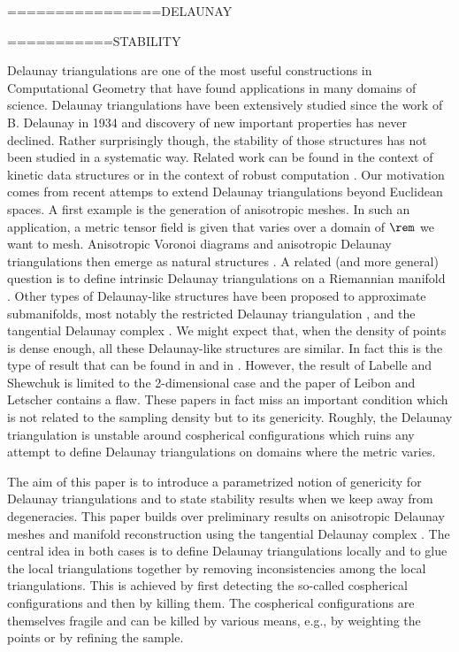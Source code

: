 ================DELAUNAY

===========STABILITY


Delaunay triangulations are one of the most useful constructions in
Computational Geometry that have found applications in many domains of
science. Delaunay triangulations have been extensively studied since
the work of B. Delaunay in 1934 and discovery of new important
properties has never declined. Rather surprisingly though, the
stability of those structures has not been studied in a systematic
way. Related work can be found in the context of kinetic data
structures \cite{Agarwal:2010:KSD:1810959.1810984} or in the context
of robust computation \cite{Salesin:1989:EGB:73833.73857}. Our
motivation comes from recent attemps to extend Delaunay triangulations
beyond Euclidean spaces. A first example is the generation of
anisotropic meshes. In such an application, a metric tensor field is given
that varies over a domain of $\rem$ we want to mesh. Anisotropic
Voronoi diagrams and anisotropic Delaunay triangulations then emerge
as natural structures \cite{labelle2003}. A related (and more general) question
is to define intrinsic Delaunay triangulations on a Riemannian
manifold \cite{leibon2000}. Other types of Delaunay-like structures have been
proposed to approximate submanifolds, most notably the restricted
Delaunay triangulation \cite{edelsbrunner1997rdt}, and the tangential Delaunay complex
\cite{boissonnat2011tancplx}. We might expect that, when the density of points is dense
enough, all these Delaunay-like structures are similar. In fact this
is the type of result that can be found in \cite{labelle2003}
and in \cite{leibon2000}. However, the result of Labelle and
Shewchuk is limited to the 2-dimensional case and the paper of Leibon
and Letscher contains a flaw. These papers in fact miss an important
condition which is not related to the sampling density but to its
genericity. Roughly, the Delaunay triangulation is unstable around
cospherical configurations which ruins any attempt to define Delaunay
triangulations on domains where the metric varies.

The aim of this paper is to introduce a parametrized notion of
genericity for Delaunay triangulations and to state stability results
when we keep away from degeneracies. This paper builds over
preliminary results on anisotropic Delaunay meshes
\cite{Boissonnat:2008:ADL:1456721.1456962} and manifold reconstruction
using the tangential Delaunay complex \cite{boissonnat2011tancplx}. The central idea in
both cases is to define Delaunay triangulations locally and to glue
the local triangulations together by removing inconsistencies among
the local triangulations. This is achieved by first detecting the
so-called cospherical configurations and then by killing them. The
cospherical configurations are themselves fragile and can be killed by
various means, e.g., by weighting the points or by refining the
sample.

